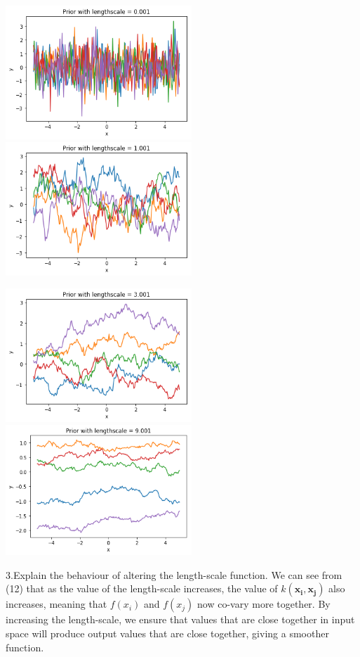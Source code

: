 \documentclass[13pt]{article}
\begin{document}
\begin{enumerate}
  \includegraphics[width=70mm,scale=0.5]{images/GPPrior1.png}
  \includegraphics[width=70mm,scale=0.5]{images/GPPrior2.png}
  
  \includegraphics[width=70mm,scale=0.5]{images/GPPrior4.png}
  \includegraphics[width=70mm,scale=0.5]{images/GPPrior5.png}
  
  3.Explain the behaviour of altering the length-scale function. 
  We can see from (12) that as the value of the length-scale increases, the value of $k(\mathbf{x_i},\mathbf{x_j})$ also increases, meaning that $f(x_i)$ and $f(x_j)$ now co-vary more together. By increasing the length-scale, we ensure that values that are close together in input space will produce output values that are close together, giving a smoother function.
  

\end{enumerate}
\end{document}
